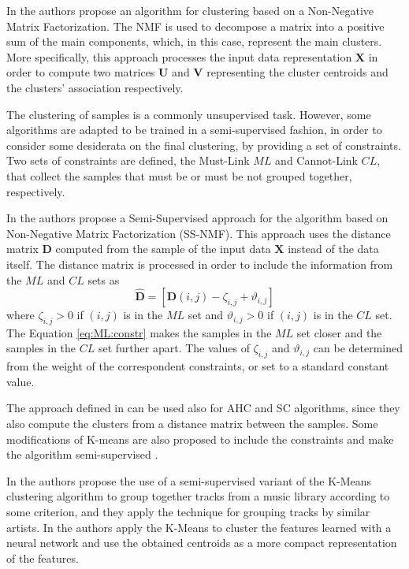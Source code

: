 In \cite{xu2003document} the authors propose an algorithm for clustering based on a Non-Negative Matrix Factorization. The NMF is used to decompose a matrix into a positive sum of the main components, which, in this case, represent the main clusters. More specifically, this approach processes the input data representation $\mathbf{X}$ in order to compute two matrices $\mathbf{U}$ and $\mathbf{V}$ representing the cluster centroids and the clusters' association respectively.

The clustering of samples is a commonly unsupervised task. However, some algorithms are adapted to be trained in a semi-supervised fashion, in order to consider some desiderata on the final clustering, by providing a set of constraints. Two sets of constraints are defined, the Must-Link $ML$ and Cannot-Link $CL$, that collect the samples that must be or must be not grouped together, respectively.

In \cite{chen2008} the authors propose a Semi-Supervised approach for the algorithm based on Non-Negative Matrix Factorization (SS-NMF). This approach uses the distance matrix $\mathbf{D}$ computed from the sample of the input data $\mathbf{X}$ instead of the data itself. The distance matrix is processed in order to include the information from the $ML$ and $CL$ sets as  
\begin{equation}
\hat{\mathbf{D}}=[\mathbf{D}(i,j) - \zeta_{i,j} + \vartheta_{i,j}] 
\label{eq:ML:constr}
\end{equation}
where $\zeta_{i,j}> 0$ if $(i,j)$ is in the $ML$ set and $\vartheta_{i,j}> 0$ if $(i,j)$ is in the $CL$ set. The Equation \ref{eq:ML:constr} makes the samples in the $ML$ set closer and the samples in the $CL$ set further apart. The values of $\zeta_{i,j}$ and $\vartheta_{i,j}$ can be determined from the weight of the correspondent constraints, or set to a standard constant value.

The approach defined in \cite{chen2008} can be used also for AHC and SC algorithms, since they also compute the clusters from a distance matrix between the samples. Some modifications of K-means are also proposed to include the constraints and make the algorithm semi-supervised \cite{Basu2002}.

In \cite{peng2007} the authors propose the use of a semi-supervised variant of the K-Means clustering algorithm to group together tracks from a music library according to some criterion, and they apply the technique for grouping tracks by similar artists.
In \cite{dieleman15} the authors apply the K-Means to cluster the features learned with a neural network and use the obtained centroids as a more compact representation of the features.


